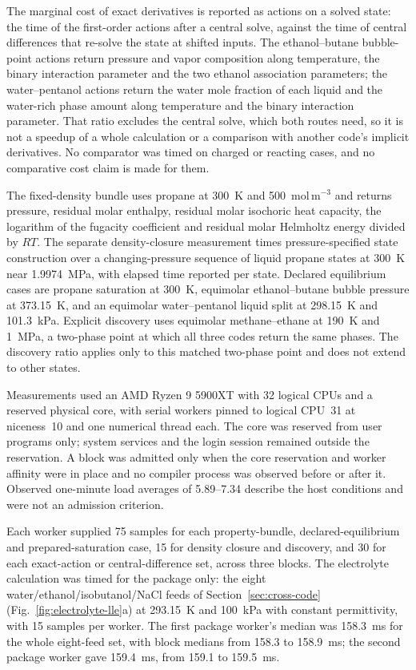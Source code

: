 The marginal cost of exact derivatives is reported as actions on a solved state: the time of the first-order actions after a central solve, against the time of central differences that re-solve the state at shifted inputs.
The ethanol--butane bubble-point actions return pressure and vapor composition along temperature, the binary interaction parameter and the two ethanol association parameters; the water--pentanol actions return the water mole fraction of each liquid and the water-rich phase amount along temperature and the binary interaction parameter.
That ratio excludes the central solve, which both routes need, so it is not a speedup of a whole calculation or a comparison with another code's implicit derivatives.
No comparator was timed on charged or reacting cases, and no comparative cost claim is made for them.

The fixed-density bundle uses propane at 300~K and 500~mol\,m$^{-3}$ and returns pressure, residual molar enthalpy, residual molar isochoric heat capacity, the logarithm of the fugacity coefficient and residual molar Helmholtz energy divided by $RT$.
The separate density-closure measurement times pressure-specified state construction over a changing-pressure sequence of liquid propane states at 300~K near 1.9974~MPa, with elapsed time reported per state.
Declared equilibrium cases are propane saturation at 300~K, equimolar ethanol--butane bubble pressure at 373.15~K, and an equimolar water--pentanol liquid split at 298.15~K and 101.3~kPa.
Explicit discovery uses equimolar methane--ethane at 190~K and 1~MPa, a two-phase point at which all three codes return the same phases.
The discovery ratio applies only to this matched two-phase point and does not extend to other states.

Measurements used an AMD Ryzen 9 5900XT with 32 logical CPUs and a reserved physical core, with serial workers pinned to logical CPU~31 at niceness~10 and one numerical thread each.
The core was reserved from user programs only; system services and the login session remained outside the reservation.
A block was admitted only when the core reservation and worker affinity were in place and no compiler process was observed before or after it.
Observed one-minute load averages of 5.89--7.34 describe the host conditions and were not an admission criterion.

Each worker supplied 75 samples for each property-bundle, declared-equilibrium and prepared-saturation case, 15 for density closure and discovery, and 30 for each exact-action or central-difference set, across three blocks.
The electrolyte calculation was timed for the package only: the eight water/ethanol/isobutanol/NaCl feeds of Section~\ref{sec:cross-code} (Fig.~\ref{fig:electrolyte-lle}a) at 293.15~K and 100~kPa with constant permittivity, with 15 samples per worker.
The first package worker's median was 158.3~ms for the whole eight-feed set, with block medians from 158.3 to 158.9~ms; the second package worker gave 159.4~ms, from 159.1 to 159.5~ms.

